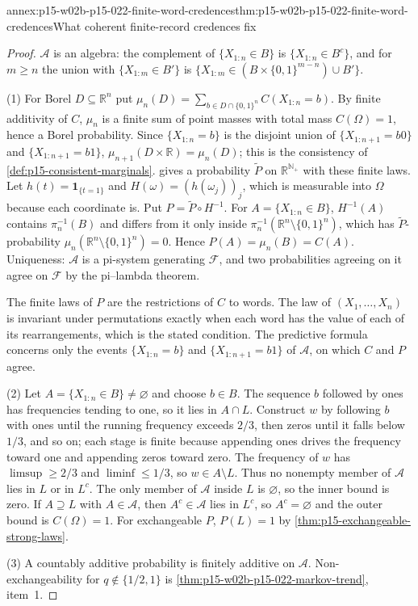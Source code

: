 \begin{annexitem}{annex:p15-w02b-p15-022-finite-word-credences}{thm:p15-w02b-p15-022-finite-word-credences}{What coherent finite-record credences fix}
\begin{proof}
\(\mathcal A\) is an algebra: the complement of \(\{X_{1:n}\in B\}\) is
\(\{X_{1:n}\in B^c\}\), and for \(m\geq n\) the union with
\(\{X_{1:m}\in B'\}\) is
\(\{X_{1:m}\in(B\times\{0,1\}^{m-n})\cup B'\}\).

(1) For Borel \(D\subseteq\mathbb R^n\) put
\(\mu_n(D)=\sum_{b\in D\cap\{0,1\}^n}C(X_{1:n}=b)\). By finite additivity
of \(C\), \(\mu_n\) is a finite sum of point masses with total mass
\(C(\Omega)=1\), hence a Borel probability. Since
\(\{X_{1:n}=b\}\) is the disjoint union of \(\{X_{1:n+1}=b0\}\) and
\(\{X_{1:n+1}=b1\}\), \(\mu_{n+1}(D\times\mathbb R)=\mu_n(D)\); this is the
consistency of \cref{def:p15-consistent-marginals}.
 gives a probability \(\tilde P\) on
\(\mathbb R^{\mathbb N_+}\) with these finite laws. Let
\(h(t)=\mathbf1_{\{t=1\}}\) and \(H(\omega)=(h(\omega_j))_j\), which is
measurable into \(\Omega\) because each coordinate is. Put
\(P=\tilde P\circ H^{-1}\). For \(A=\{X_{1:n}\in B\}\),
\(H^{-1}(A)\) contains \(\pi_n^{-1}(B)\) and differs from it only inside
\(\pi_n^{-1}(\mathbb R^n\setminus\{0,1\}^n)\), which has
\(\tilde P\)-probability \(\mu_n(\mathbb R^n\setminus\{0,1\}^n)=0\). Hence
\(P(A)=\mu_n(B)=C(A)\). Uniqueness: \(\mathcal A\) is a pi-system
generating \(\mathcal F\), and two probabilities agreeing on it agree on
\(\mathcal F\) by the pi--lambda theorem.

The finite laws of \(P\) are the restrictions of \(C\) to words. The law of
\((X_1,\ldots,X_n)\) is invariant under permutations exactly when each word
has the value of each of its rearrangements, which is the stated condition.
The predictive formula concerns only the events \(\{X_{1:n}=b\}\) and
\(\{X_{1:n+1}=b1\}\) of \(\mathcal A\), on which \(C\) and \(P\) agree.

(2) Let \(A=\{X_{1:n}\in B\}\neq\varnothing\) and choose \(b\in B\).
The sequence \(b\) followed by ones has frequencies tending to one, so it lies
in \(A\cap L\). Construct \(w\) by following \(b\) with ones until the running
frequency exceeds \(2/3\), then zeros until it falls below \(1/3\), and so
on; each stage is finite because appending ones drives the frequency toward
one and appending zeros toward zero. The frequency of \(w\) has
\(\limsup\geq2/3\) and \(\liminf\leq1/3\), so \(w\in A\setminus L\).
Thus no nonempty member of \(\mathcal A\) lies in \(L\) or in \(L^c\). The
only member of \(\mathcal A\) inside \(L\) is \(\varnothing\), so the inner
bound is zero. If \(A\supseteq L\) with \(A\in\mathcal A\), then
\(A^c\in\mathcal A\) lies in \(L^c\), so \(A^c=\varnothing\) and the outer
bound is \(C(\Omega)=1\). For exchangeable \(P\),
\(P(L)=1\) by \cref{thm:p15-exchangeable-strong-laws}.

(3) A countably additive probability is finitely additive on
\(\mathcal A\). Non-exchangeability for \(q\notin\{1/2,1\}\) is
\cref{thm:p15-w02b-p15-022-markov-trend}, item~1.
\end{proof}
\end{annexitem}

